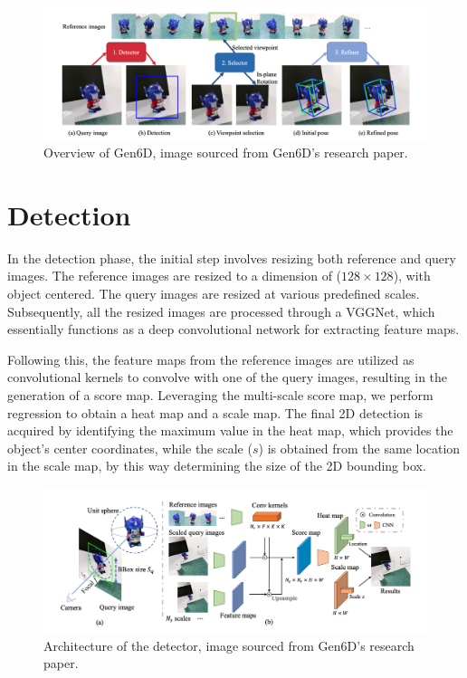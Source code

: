 \begin{figure}[ht]
  \centering
  \includegraphics[width=\textwidth]{data/gen6d1.png}
  \caption{Overview of Gen6D, image sourced from Gen6D's research paper.}
  \label{fig:fig0}
\end{figure}

\section{Detection}

In the detection phase, the initial step involves resizing both reference and query images. The reference images are resized to a dimension of ($128 \times 128$), with object centered. The query images are resized at various predefined scales. Subsequently, all the resized images are processed through a \ac{VGGNet}, which essentially functions as a deep convolutional network for extracting feature maps.

Following this, the feature maps from the reference images are utilized as convolutional kernels to convolve with one of the query images, resulting in the generation of a score map. Leveraging the multi-scale score map, we perform regression to obtain a heat map and a scale map. The final 2D detection is acquired by identifying the maximum value in the heat map, which provides the object's center coordinates, while the scale ($s$) is obtained from the same location in the scale map, by this way determining the size of the 2D bounding box.

\begin{figure}[ht]
  \centering
  \includegraphics[width=\textwidth]{data/gen6d2.png}
  \caption{Architecture of the detector, image sourced from Gen6D's research paper.}
  \label{fig:fig1}
\end{figure}

